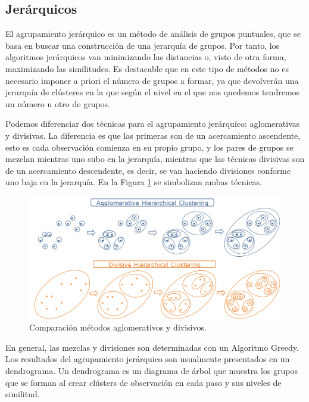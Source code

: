 \documentclass[a4paper, 20pt]{article}
\begin{document}
\subsection{Jerárquicos}
El agrupamiento jerárquico es un método de análisis de grupos puntuales, que se basa en buscar una construcción de una jerarquía de grupos. Por tanto, los algoritmos jerárquicos van minimizando las distancias  o, visto de otra forma, maximizando  las similitudes. Es destacable que en este tipo de métodos no es necesario imponer a priori el número de grupos a formar, ya que devolverán una jerarquía de clústeres en la que según el nivel en el que nos quedemos tendremos un número u otro de grupos.

Podemos diferenciar dos técnicas para el agrupamiento jerárquico: aglomerativas y divisivas. La diferencia es que las primeras son de un acercamiento ascendente, esto es cada observación comienza en su propio grupo, y los pares de grupos se mezclan mientras uno subo en la jerarquía, mientras que las técnicas divisivas son de un acercamiento descendente, es decir, se van haciendo divisiones conforme uno baja en la jerarquía. En la Figura \ref{fig:agl_div} se simbolizan ambas técnicas.


\vspace{5mm}

\begin{figure}[H]
	\centering
	\includegraphics[scale=0.25]{victoria/compAglomeDivisivo}
	\caption{Comparación métodos aglomerativos y divisivos.}
	\label{fig:agl_div}
\end{figure}

En general, las mezclas y divisiones son determinadas con un Algoritmo Greedy. Los resultados del agrupamiento jerárquico son usualmente presentados en un dendrograma. Un dendrograma es un diagrama de árbol que muestra los grupos que se forman al crear clústers de observación en cada paso y sus niveles de similitud.
\end{document}
